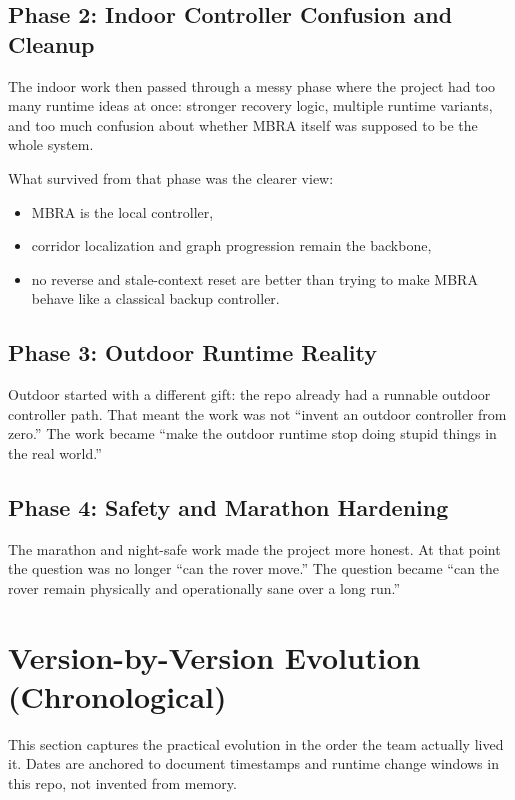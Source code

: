 \documentclass[11pt]{article}
\begin{document}
\subsection{Phase 2: Indoor Controller Confusion and Cleanup}

The indoor work then passed through a messy phase where the project had too many
runtime ideas at once: stronger recovery logic, multiple runtime variants, and too
much confusion about whether MBRA itself was supposed to be the whole system.

What survived from that phase was the clearer view:

\begin{itemize}[nosep]
  \item MBRA is the local controller,
  \item corridor localization and graph progression remain the backbone,
  \item no reverse and stale-context reset are better than trying to make MBRA
  behave like a classical backup controller.
\end{itemize}

\subsection{Phase 3: Outdoor Runtime Reality}

Outdoor started with a different gift: the repo already had a runnable outdoor
controller path. That meant the work was not ``invent an outdoor controller from
zero.'' The work became ``make the outdoor runtime stop doing stupid things in the
real world.''

\subsection{Phase 4: Safety and Marathon Hardening}

The marathon and night-safe work made the project more honest. At that point the
question was no longer ``can the rover move.'' The question became ``can the rover
remain physically and operationally sane over a long run.''

\section{Version-by-Version Evolution (Chronological)}

This section captures the practical evolution in the order the team actually lived
it. Dates are anchored to document timestamps and runtime change windows in this
repo, not invented from memory.
\end{document}
